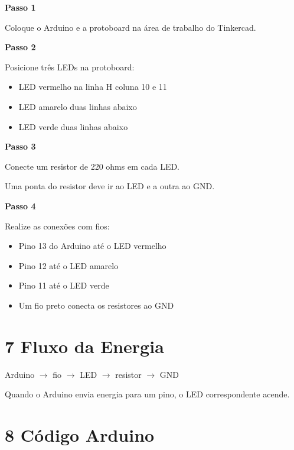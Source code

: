 \documentclass[12pt,a4paper]{article}
\begin{document}
\noindent\textbf{\large Passo 1}

Coloque o Arduino e a protoboard na área de trabalho do Tinkercad.

\noindent\textbf{\large Passo 2}

Posicione três LEDs na protoboard:

\begin{itemize}

\item LED vermelho na linha H coluna 10 e 11
\item LED amarelo duas linhas abaixo
\item LED verde duas linhas abaixo

\end{itemize}

\noindent\textbf{\large Passo 3}

Conecte um resistor de 220 ohms em cada LED.

Uma ponta do resistor deve ir ao LED e a outra ao GND.

\noindent\textbf{\large Passo 4}

Realize as conexões com fios:

\begin{itemize}

\item Pino 13 do Arduino até o LED vermelho
\item Pino 12 até o LED amarelo
\item Pino 11 até o LED verde
\item Um fio preto conecta os resistores ao GND

\end{itemize}

\section*{7 Fluxo da Energia}

Arduino $\rightarrow$ fio $\rightarrow$ LED $\rightarrow$ resistor $\rightarrow$ GND

Quando o Arduino envia energia para um pino, o LED correspondente acende.

\section*{8 Código Arduino}
\end{document}

